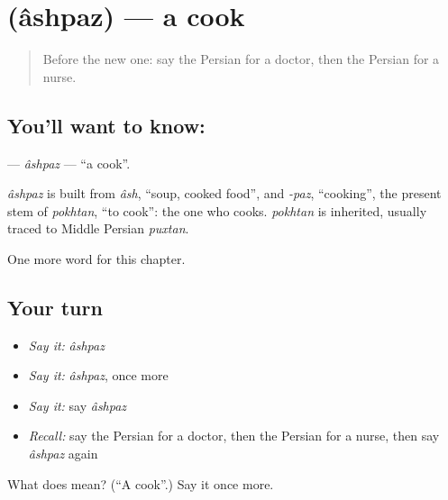 \section[\texorpdfstring{\fa{آشپز} (âshpaz)}{آشپز (âshpaz)}]{ (âshpaz) — a cook}

\label{lesson:FA-C115-ashpaz}



\begin{quote}
Before the new one: say the Persian for a doctor, then the Persian for a nurse.
\end{quote}

\subsection*{You'll want to know: }
\textbf{} — \emph{âshpaz} — \textquotedblleft{}a cook\textquotedblright{}.

\begin{cousinweb}
\emph{âshpaz} is built from \emph{âsh}, \textquotedblleft{}soup, cooked food\textquotedblright{}, and \emph{-paz}, \textquotedblleft{}cooking\textquotedblright{}, the present stem of \emph{pokhtan}, \textquotedblleft{}to cook\textquotedblright{}: the one who cooks. \emph{pokhtan} is inherited, usually traced to Middle Persian \emph{puxtan}.
\end{cousinweb}

\begin{grammarlens}[title={What you've built}]
One more word for this chapter.
\end{grammarlens}

\subsection*{Your turn}
\begin{itemize}
\raggedright
  \item \emph{Say it:} \emph{âshpaz}
  \item \emph{Say it:} \emph{âshpaz}, once more
  \item \emph{Say it:} say \emph{âshpaz}
  \item \emph{Recall:} say the Persian for a doctor, then the Persian for a nurse, then say \emph{âshpaz} again
\end{itemize}

\begin{tcolorbox}[breakable,colback=teal!4,colframe=teal!35!black,title={Before you move on}]
What does  mean? (\textquotedblleft{}A cook\textquotedblright{}.) Say it once more.
\end{tcolorbox}
